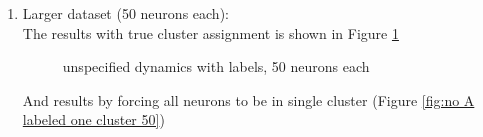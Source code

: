 \documentclass[]{article}
\begin{document}
\begin{enumerate}
	\item
	Larger dataset (50 neurons each):\\
	The results with true cluster assignment is shown in Figure \ref{fig:no A labeled 50}
	\begin{figure}[h!]
		\caption{unspecified dynamics with labels, 50 neurons each}
		\label{fig:no A labeled 50}
	\end{figure}
	And results by forcing all neurons to be in single cluster (Figure \ref{fig:no A labeled one cluster 50})
	\begin{figure}[h!]
		\makebox[\linewidth][c]{%
}
\end{figure}
\end{enumerate}
\end{document}
